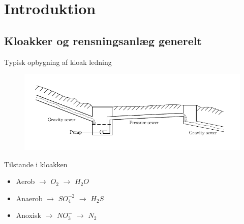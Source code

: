 

\section{Introduktion} %


\subsection{Kloakker og rensningsanlæg generelt} %
\begin{frame}{Typisk opbygning af kloak ledning}{}
\vfill\vfill\centering
\begin{figure}[H]
\centering
\includegraphics[width=1\textwidth]{Sections/pictures/Sewer_drawing.pdf}
\end{figure}
\vfill\vfill
\end{frame}
%

\begin{frame}{Tilstande i kloakken}
\vfill\vfill\centering
\begin{itemize}
	\item<1-> Aerob $\rightarrow$ $O_2$ $\rightarrow$ $H_2O$
	\item<2-> Anaerob $\rightarrow$ $SO_4^{-2}$ $\rightarrow$ $H_2S$
	\item<3-> Anoxisk $\rightarrow$ $NO_3^-$ $\rightarrow$ $N_2$
\end{itemize}
\vfill\vfill	
\end{frame}

